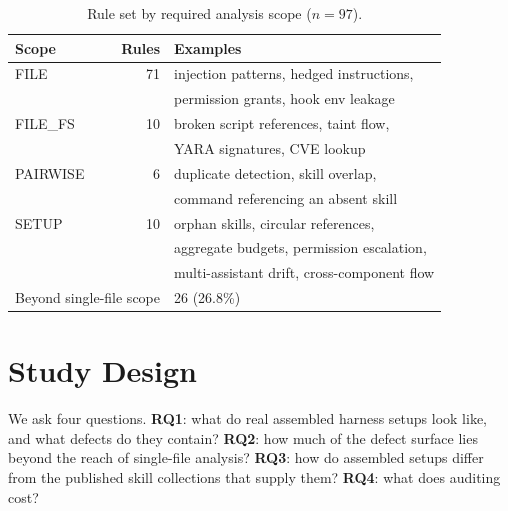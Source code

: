 \documentclass[conference]{IEEEtran}
\begin{document}
\begin{table}[t]
\caption{Rule set by required analysis scope ($n=97$).}
\label{tab:scope}
\centering
\small
\begin{tabular}{lrl}
\toprule
Scope & Rules & Examples \\
\midrule
FILE     & 71 & injection patterns, hedged instructions, \\
         &    & permission grants, hook env leakage \\
FILE\_FS & 10 & broken script references, taint flow, \\
         &    & YARA signatures, CVE lookup \\
PAIRWISE &  6 & duplicate detection, skill overlap, \\
         &    & command referencing an absent skill \\
SETUP    & 10 & orphan skills, circular references, \\
         &    & aggregate budgets, permission escalation, \\
         &    & multi-assistant drift, cross-component flow \\
\midrule
\multicolumn{2}{l}{Beyond single-file scope} & 26 (26.8\%) \\
\bottomrule
\end{tabular}
\end{table}

\section{Study Design}
\label{sec:design}

We ask four questions. \textbf{RQ1}: what do real assembled harness setups look
like, and what defects do they contain? \textbf{RQ2}: how much of the defect
surface lies beyond the reach of single-file analysis? \textbf{RQ3}: how do
assembled setups differ from the published skill collections that supply them?
\textbf{RQ4}: what does auditing cost?
\end{document}
